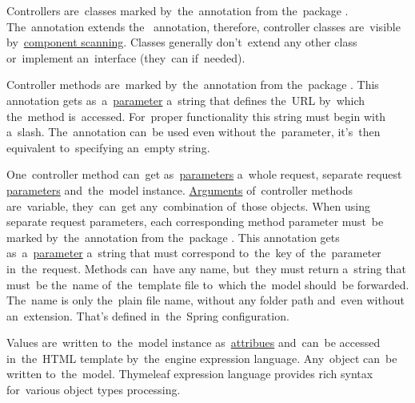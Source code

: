 \noindent Controllers are~classes marked by~the~annotation  from the~package .
The~annotation extends the~ annotation, therefore, controller classes are~visible by~\hyperref[iocannotations]{component scanning}.
Classes generally don't~extend any other class or~implement an~interface (they~can if~needed).

Controller methods are~marked by~the~annotation  from the~package .
This annotation gets as~a~\hyperref[parameterargument]{parameter} a~string that defines the~URL by~which the~method is~accessed.
For~proper functionality this string must begin with a~slash.
The~annotation can~be used even without the~parameter, it's~then equivalent to~specifying an~empty string.

One~controller method can~get as~\hyperref[parameterargument]{parameters} a~whole request, separate request \hyperref[jspattributeparameter]{parameters} and~the~model instance.
\hyperref[parameterargument]{Arguments} of~controller methods are~variable, they~can~get any~combination of~those objects.
When using separate request parameters, each corresponding method parameter must~be marked by~the~annotation  from the~package .
This annotation gets as~a~\hyperref[parameterargument]{parameter} a~string that must correspond to~the~key of~the~parameter in~the~request.
Methods can~have any name, but~they must return a~string that must~be the~name of~the~template file to~which the~model should~be forwarded.
The~name is only the~plain file name, without any folder path and~even without an~extension. That's defined in~the~Spring configuration.

Values are~written to~the~model instance as~\hyperref[jspattributeparameter]{attribues} and~can~be accessed in~the~HTML template by~the~engine expression language.
Any~object can~be written to~the~model.
Thymeleaf expression language provides rich syntax for~various object types processing.
\newpage

